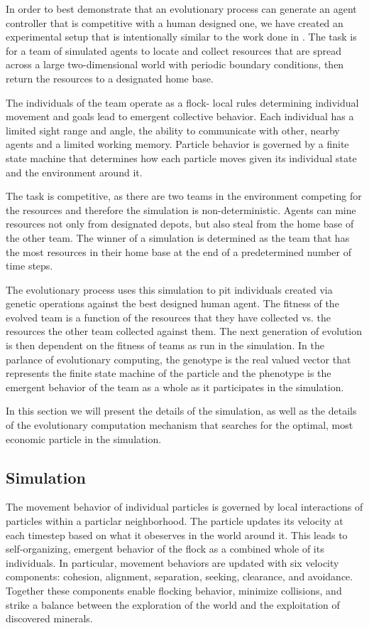 \documentclass[12pt,journal,compsoc]{IEEEtran}
\begin{document}
In order to best demonstrate that an evolutionary process can generate an agent controller that is competitive with a human designed one, we have created an experimental setup that is intentionally similar to the work done in \cite{rodriguez2004extending}. The task is for a team of simulated agents to locate and collect resources that are spread across a large two-dimensional world with periodic boundary conditions, then return the resources to a designated home base.

The individuals of the team operate as a flock- local rules determining individual movement and goals lead to emergent collective behavior. Each individual has a limited sight range and angle, the ability to communicate with other, nearby agents and a limited working memory. Particle behavior is governed by a finite state machine that determines how each particle moves given its individual state and the environment around it.

The task is competitive, as there are two teams in the environment competing for the resources and therefore the simulation is non-deterministic. Agents can mine resources not only from designated depots, but also steal from the home base of the other team. The winner of a simulation is determined as the team that has the most resources in their home base at the end of a predetermined number of time steps.

The evolutionary process uses this simulation to pit individuals created via genetic operations against the best designed human agent. The fitness of the evolved team is a function of the resources that they have collected vs. the resources the other team collected against them. The next generation of evolution is then dependent on the fitness of teams as run in the simulation. In the parlance of evolutionary computing, the genotype is the real valued vector that represents the finite state machine of the particle and the phenotype is the emergent behavior of the team as a whole as it participates in the simulation.

In this section we will present the details of the simulation, as well as the details of the evolutionary computation mechanism that searches for the optimal, most economic particle in the simulation.

\subsection{Simulation}

The movement behavior of individual particles is governed by local interactions of particles within a particlar neighborhood. The particle updates its velocity at each timestep based on what it obeserves in the world around it. This leads to self-organizing, emergent behavior of the flock as a combined whole of its individuals. In particular, movement behaviors are updated with six velocity components: cohesion, alignment, separation, seeking, clearance, and avoidance. Together these components enable flocking behavior, minimize collisions, and strike a balance between the exploration of the world and the exploitation of discovered minerals.
\end{document}
